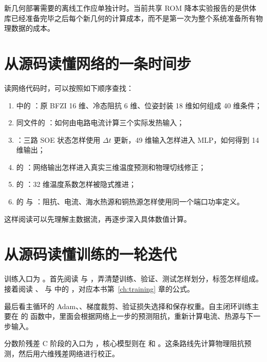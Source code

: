 新几何部署需要的离线工作应单独计时。当前共享 ROM 降本实验报告的是供体库已经准备完毕之后每个新几何的计算成本，而不是第一次为整个系统准备所有物理数据的成本。

\section{从源码读懂网络的一条时间步}
读网络代码时，可以按照如下顺序查找：
\begin{enumerate}
\item {} 中的 ：原 BFZI 16 维、冷态阻抗 6 维、位姿封装 18 维如何组成 40 维条件；
\item 同文件的 ：如何由电路电流计算三个实际发热输入；
\item {}：三路 SOE 状态怎样使用 $\Delta t$ 更新，49 维输入怎样进入 MLP，如何得到 14 维输出；
\item {} 的 ：网络输出怎样进入真实三维温度预测和物理切线修正；
\item {} 的 ：32 维温度系数怎样被隐式推进；
\item {} 的  与 ：阻抗、电流、海水热源和铜热源怎样使用同一个端口功率定义。
\end{enumerate}
这样阅读可以先理解主数据流，再逐步深入具体数值计算。

\section{从源码读懂训练的一轮迭代}
训练入口为 。首先阅读  与 ，弄清楚训练、验证、测试怎样划分，标签怎样组成。接着阅读 、 与  中的 ，对应本书第~\ref{ch:training} 章的公式。

最后看主循环的 Adam、、梯度裁剪、验证损失选择和保存权重。自主闭环训练主要在  的  函数中，里面会根据网络上一步的预测阻抗，重新计算电流、热源与下一步输入。

分数阶残差 C 阶段的入口为 ，核心模型则在  和 。这条路线先计算物理阻抗预测，然后用六维残差网络进行校正。


